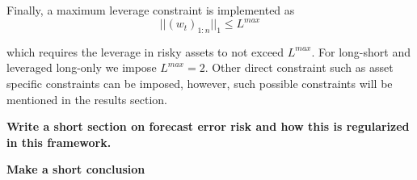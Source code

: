 Finally, a maximum leverage constraint is implemented as
\begin{equation}
    || (w_t)_{1:n} ||_1 \leq L^{max}
\end{equation}

which requires the leverage in risky assets to not exceed $L^{max}$. For long-short and leveraged long-only we impose $L^{max}=2$. Other direct constraint such as asset specific constraints can be imposed, however, such possible constraints will be mentioned in the results section.


\textbf{Write a short section on forecast error risk and how this is regularized in this framework.}

\textbf{Make a short conclusion}